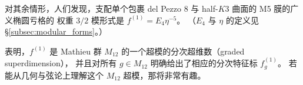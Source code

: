 \documentclass[11pt,a4paper,fontset=windows]{ctexart}
\numberwithin{equation}{section}
\begin{document}
对其余情形，人们发现，支配单个包裹 del Pezzo 8 与 half-$K3$ 曲面的 M5 膜的广义椭圆亏格的
权重 $3/2$ 模形式是 $f^{(1)}= E_4\eta^{-5}$。
（$E_4$ 与 $\eta$ 的定义见 \S\ref{subsec:modular_forms}。）

\cite{Cheng:2017dlj} 表明，$f^{(1)}$ 是 Mathieu 群 $M_{12}$ 的一个超模的分次超维数（graded superdimension），
并且对所有 $g\in M_{12}$ 明确给出了相应的分次特征标 $f^{(1)}_g$。
若能从几何与弦论上理解这个 $M_{12}$ 超模，那将非常有趣。




\newpage
{}
\end{document}

